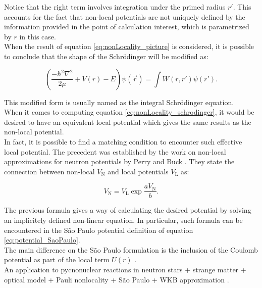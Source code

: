 \documentclass[openany]{book}
\begin{document}
Notice that the right term involves integration under the primed radius $r'$. This accounts for the fact that non-local potentials are not uniquely defined by the information provided in the point of calculation interest, which is parametrized by $r$ in this case. \\

When the result of equation \ref{eq:nonLocality_picture} is considered, it is possible to conclude that the shape of the Schrödinger will be modified as:

\begin{equation} \label{eq:nonLocality_schrodinger}
	\left(\frac{-\hbar^2 \nabla^2}{2\mu} + V(r)  - E  \right) \psi(\vec r) =   \int W(r, r') \psi(r').
\end{equation}

This modified form is usually named as the integral Schrödinger equation. \\

When it comes to computing equation \ref{eq:nonLocality_schrodinger}, it would be desired to have an equivalent local potential which gives the same results as the non-local potential. \\

In fact, it is possible to find a matching condition to encounter such effective local potential. The precedent was established by the work on non-local approximations for neutron potentials by Perry and Buck \cite{perey_buck_1962}. They state the connection between non-local $V_{\mathrm{N}}$ and local potentials $V_{\mathrm{L}}$ as:

\begin{equation}\label{eq:nonLocality_connection}
	V_{\mathrm{N}} = V_{\mathrm{L}} \exp{\frac{a V_{\mathrm{N}}}{b}}.
\end{equation}

The previous formula gives a way of calculating the desired potential by solving an implicitely defined non-linear equation. In particular, such formula can be encountered in the São Paulo potential definition of equation \ref{eq:potential_SaoPaulo}. \\

The main difference on the São Paulo formulation is the inclusion of the Coulomb potential as part of the local term $U(r)$ . \\

An application to pycnonuclear reactions in neutron stars + strange matter + optical model + Pauli nonlocality + São Paulo  + WKB approximation \cite{golf_hellmers_weber_2009}.\\ 
\end{document}
